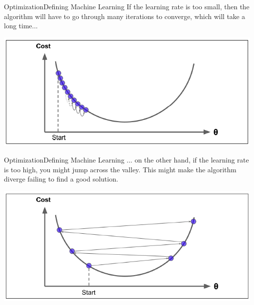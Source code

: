 \documentclass[11pt]{beamer}
\begin{document}
\begin{frame}{Optimization}{Defining Machine Learning}
If the learning rate is too small, then the algorithm
will have to go through many iterations to converge, which will take a long time...   \begin{center}
   \includegraphics[scale=.6]{../05-pictures/lesson-1-1_pic_9.png} 	
   \end{center}
\end{frame}
\begin{frame}{Optimization}{Defining Machine Learning}
... on the other hand, if the learning rate is too high, you might jump across the valley. This might make the algorithm diverge failing to find a good solution. 
   \begin{center}
   \includegraphics[scale=.6]{../05-pictures/lesson-1-1_pic_10.png} 	
   \end{center}
\end{frame}
\end{document}
